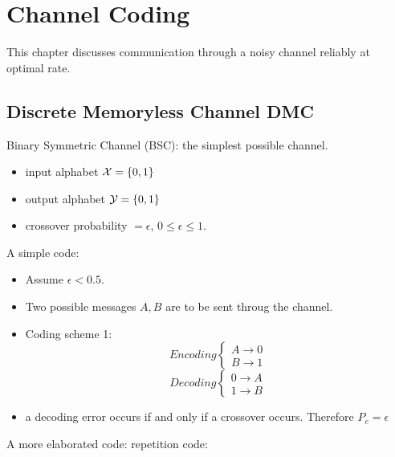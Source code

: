 \documentclass[../main.tex]{subfiles}
\begin{document}
\chapter{Channel Coding}
This chapter discusses communication through a noisy channel reliably at optimal rate.
\section*{Discrete Memoryless Channel DMC}
Binary Symmetric Channel (BSC): the simplest possible channel.
\begin{itemize}
    \item input alphabet $\mathcal{X}=\{0,1\}$
    \item output alphabet $\mathcal{Y}=\{0,1\}$
    \item crossover probability $=\epsilon$, $0\leq\epsilon\leq 1$.
\end{itemize}
A simple code:
\begin{itemize}
    \item Assume $\epsilon < 0.5$.
    \item Two possible messages $A,B$ are to be sent throug the channel. 
    \item Coding scheme 1: \[
    Encoding \begin{cases}
        A\to 0\\
        B\to 1
    \end{cases}
    \]
    \[Decoding \begin{cases}
    0\to A\\
    1\to B
        \end{cases}\]
    \item a decoding error occurs if and only if a crossover occurs. Therefore $P_e=\epsilon$
\end{itemize}
A more elaborated code: repetition code:
\end{document}
